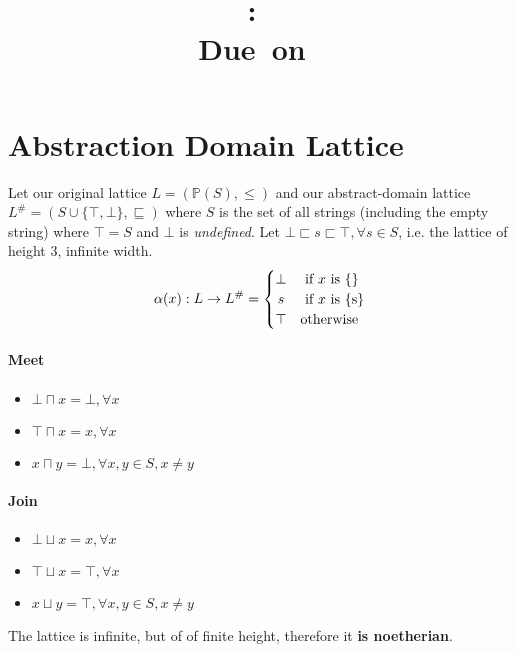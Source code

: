 \documentclass{article}
\title{
\vspace{2in}
\textmd{\textbf{\hmwkClass:\ \hmwkTitle}}\\
\normalsize\vspace{0.1in}\small{Due\ on\ \hmwkDueDate}\\
\vspace{0.1in}\large{\textit{\hmwkClassInstructor}}
\vspace{3in}
}
\author{\textbf{\hmwkAuthorName}}
\date{} %
\newcommand{\powerset}[1]{\mathbb{P}(#1)}
\begin{document}
\maketitle
\newpage



\section{Abstraction Domain Lattice}
Let our original lattice $L = (\powerset{S}, \leq)$ and our abstract-domain lattice $L^\# = (S \cup \{ \top,\bot \},\sqsubseteq)$ where $S$ is the set of all strings (including the empty string) where $\top = S$ and $\bot$ is \emph{undefined}. Let $\bot \sqsubset s \sqsubset \top, \forall s \in S$, i.e. the lattice of height 3, infinite width. 
\[
 \alpha(x): L \rightarrow L^\# =
  \begin{cases} 
      \hfill \bot    \hfill & \text{ if $x$ is \{\}} \\
      \hfill s \hfill & \text{ if $x$ is \{s\}} \\
      \hfill \top \hfill & \text{otherwise}
  \end{cases}
\]

\paragraph{Meet}
\begin{itemize}
	\item $\bot \sqcap x = \bot, \forall x$
	\item $\top \sqcap x = x, \forall x$
	\item $x \sqcap y = \bot, \forall x,y \in S, x \neq y$
\end{itemize}
\paragraph{Join}
\begin{itemize}
	\item $\bot \sqcup x = x, \forall x$
	\item $\top \sqcup x = \top, \forall x$
	\item $x \sqcup y = \top, \forall x,y \in S, x \neq y$
\end{itemize}

The lattice is infinite, but of of finite height, therefore it \textbf{is noetherian}.
\end{document}
